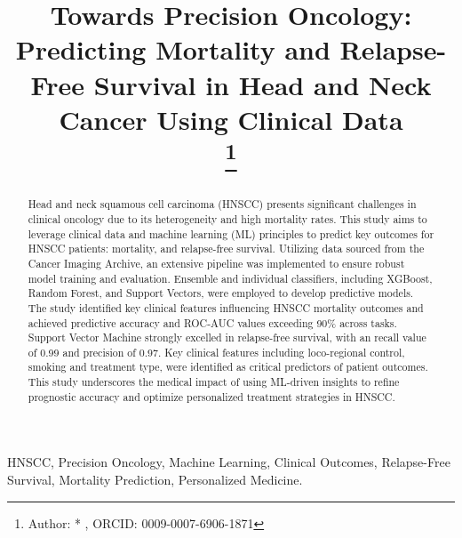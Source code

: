 \documentclass[conference]{IEEEtran}
\begin{document}
\title{Towards Precision Oncology: Predicting Mortality and Relapse-Free Survival in Head and Neck Cancer Using Clinical Data\\
\thanks{Author: * , ORCID: 0009-0007-6906-1871}
}

\author{
\and
{}
}

\maketitle

\begin{abstract}
Head and neck squamous cell carcinoma (HNSCC) presents significant challenges in clinical oncology due to its heterogeneity and high mortality rates. This study aims to leverage clinical data and machine learning (ML) principles to predict key outcomes for HNSCC patients: mortality, and relapse-free survival. Utilizing data sourced from the Cancer Imaging Archive, an extensive pipeline was implemented to ensure robust model training and evaluation. Ensemble and individual classifiers, including XGBoost, Random Forest, and Support Vectors, were employed to develop predictive models. The study identified key clinical features influencing HNSCC mortality outcomes and achieved predictive accuracy and ROC-AUC values exceeding 90\% across tasks. Support Vector Machine strongly excelled in relapse-free survival, with an recall value of 0.99 and precision of 0.97. Key clinical features including loco-regional control, smoking and treatment type, were identified as critical predictors of patient outcomes. This study underscores the medical impact of using ML-driven insights to refine prognostic accuracy and optimize personalized treatment strategies in HNSCC.
\end{abstract}

\begin{IEEEkeywords}
HNSCC, Precision Oncology, Machine Learning, Clinical Outcomes, Relapse-Free Survival, Mortality Prediction, Personalized Medicine.
\end{IEEEkeywords}
\end{document}
